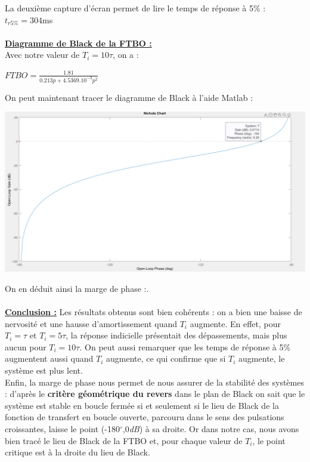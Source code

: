 \documentclass[12pt]{article}
\begin{document}
La deuxième capture d'écran permet de lire le temps de réponse à 5$\%$ : $t_{r5\%} = 304$ms
\\\\\underline{\bf Diagramme de Black de la FTBO :}
\\\normalsize Avec notre valeur de $T_i = 10\tau$, on a :
\begin{center}
    \large$FTBO = \frac{1.81}{0.213p + 4.5369.10^{-3}p^2}$
\end{center}
\normalsize On peut maintenant tracer le diagramme de Black à l'aide Matlab :
\begin{center}
    \includegraphics[width = 19 cm]{TP2 Simulink/Syst_1/Ti=10tau_syst_1_Black.png}
\end{center}
On en déduit ainsi la marge de phase :.
\\\\\underline{\bf Conclusion :} Les résultats obtenus sont bien cohérents : on a bien une baisse de nervosité et une hausse d'amortissement quand $T_i$ augmente.
En effet, pour $T_i = \tau$ et $T_i = 5\tau$, la réponse indicielle présentait des dépassements, mais plus aucun pour $T_i = 10\tau$. On peut aussi remarquer que les temps de réponse à 5$\%$ augmentent aussi quand $T_i$ augmente, ce qui confirme que si $T_i$ augmente, le système est plus lent.
\\Enfin, la marge de phase nous permet de nous assurer de la stabilité des systèmes : d'après le \textbf{critère géométrique du revers} dans le plan de Black on sait que le système est stable en boucle fermée si et seulement si le lieu de Black de la fonction de transfert en boucle ouverte, parcouru dans le sens des pulsations croissantes, laisse le point (-180$^{\circ}$,0\textit{dB}) à sa droite.
Or dans notre cas, nous avons bien tracé le lieu de Black de la FTBO et, pour chaque valeur de $T_i$, le point critique est à la droite du lieu de Black.
\end{document}
